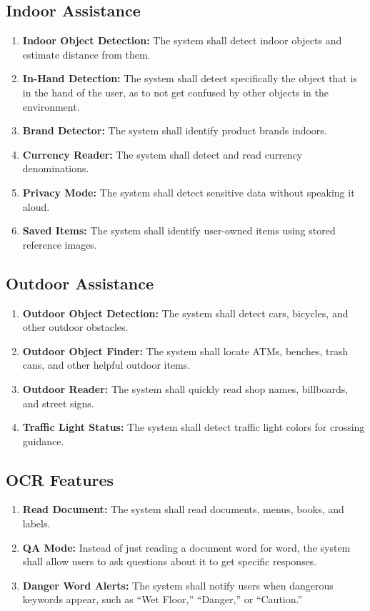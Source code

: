 \documentclass[a4paper]{report}
\begin{document}
\subsection{Indoor Assistance}

\begin{enumerate}[label=FR-IN-\arabic*:]
    \item \textbf{Indoor Object Detection:} The system shall detect indoor objects and estimate distance from them.
    \item \textbf{In-Hand Detection:} The system shall detect specifically the object that is in the hand of the user, as to not get confused by other objects in the environment.
    \item \textbf{Brand Detector:} The system shall identify product brands indoors.
    \item \textbf{Currency Reader:} The system shall detect and read currency denominations.
    \item \textbf{Privacy Mode:} The system shall detect sensitive data without speaking it aloud.
    \item \textbf{Saved Items:} The system shall identify user-owned items using stored reference images.
\end{enumerate}

\subsection{Outdoor Assistance}

\begin{enumerate}[label=FR-OUT-\arabic*:]
    \item \textbf{Outdoor Object Detection:} The system shall detect cars, bicycles, and other outdoor obstacles.
    \item \textbf{Outdoor Object Finder:} The system shall locate ATMs, benches, trash cans, and other helpful outdoor items.
    \item \textbf{Outdoor Reader:} The system shall quickly read shop names, billboards, and street signs.
    \item \textbf{Traffic Light Status:} The system shall detect traffic light colors for crossing guidance.
\end{enumerate}

\subsection{OCR Features}

\begin{enumerate}[label=FR-OCR-\arabic*:]
    \item \textbf{Read Document:} The system shall read documents, menus, books, and labels.
    \item \textbf{QA Mode:} Instead of just reading a document word for word, the system shall allow users to ask questions about it to get specific responses.
    \item \textbf{Danger Word Alerts:} The system shall notify users when dangerous keywords appear, such as ``Wet Floor,'' ``Danger,'' or ``Caution.''
\end{enumerate}
\end{document}

